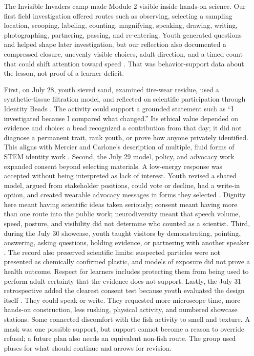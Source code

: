 
\vspace{-0.2cm}
The Invisible Invaders camp made Module 2 visible inside hands-on science. Our first field investigation offered routes such as observing, selecting a sampling location, scooping, labeling, counting, magnifying, speaking, drawing, writing, photographing, partnering, passing, and re-entering. Youth generated questions and helped shape later investigation, but our reflection also documented a compressed closure, unevenly visible choices, adult direction, and a timed count that could shift attention toward speed \citep{campteam2026day1}. That was behavior-support data about the lesson, not proof of a learner deficit.

First, on July 28, youth sieved sand, examined tire-wear residue, used a synthetic-tissue filtration model, and reflected on scientific participation through Identity Beads \citep{campteam2026day3}. The activity could support a grounded statement such as ``I investigated because I compared what changed.'' Its ethical value depended on evidence and choice: a bead recognized a contribution from that day; it did not diagnose a permanent trait, rank youth, or prove how anyone privately identified. This aligns with Mercier and Carlone's description of multiple, fluid forms of STEM identity work \citep{mercier2021identibeads}. Second, the July 29 model, policy, and advocacy work expanded consent beyond selecting materials. A low-energy response was accepted without being interpreted as lack of interest. Youth revised a shared model, argued from stakeholder positions, could vote or decline, had a write-in option, and created wearable advocacy messages in forms they selected \citep{campteam2026day4}. Dignity here meant having scientific ideas taken seriously; consent meant having more than one route into the public work; neurodiversity meant that speech volume, speed, posture, and visibility did not determine who counted as a scientist. Third, during the July 30 showcase, youth taught visitors by demonstrating, pointing, answering, asking questions, holding evidence, or partnering with another speaker \citep{campteam2026day5}. The record also preserved scientific limits: suspected particles were not presented as chemically confirmed plastic, and models of exposure did not prove a health outcome. Respect for learners includes protecting them from being used to perform adult certainty that the evidence does not support. Lastly, the July 31 retrospective added the clearest consent test because youth evaluated the design itself \citep{campteam2026day6}. They could speak or write. They requested more microscope time, more hands-on construction, less rushing, physical activity, and numbered showcase stations. Some connected discomfort with the fish activity to smell and texture. A mask was one possible support, but support cannot become a reason to override refusal; a future plan also needs an equivalent non-fish route. The group used pluses for what should continue and arrows for revision.

